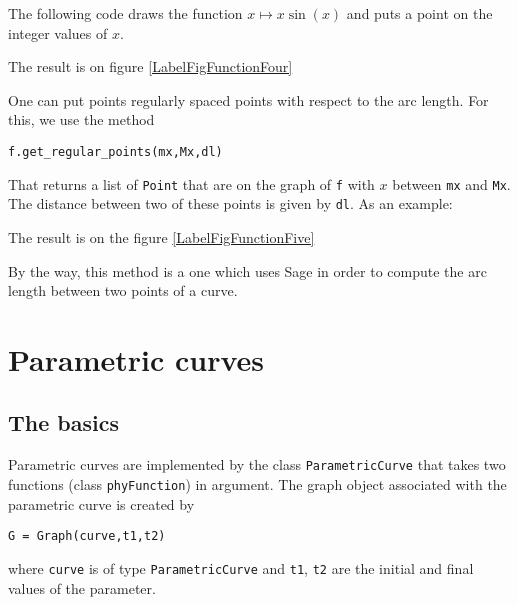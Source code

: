 The following code draws the function $x\mapsto x\sin(x)$ and puts a point on the integer values of $x$.

The result is on figure \ref{LabelFigFunctionFour}
\newcommand{\CaptionFigFunctionFour}{Some points on the graph of a function. These points are regularly espaced with respect to the $x$ value.}


One can put points regularly spaced points with respect to the arc length. For this, we use the method
\begin{verbatim}
f.get_regular_points(mx,Mx,dl)
\end{verbatim}
That returns a list of \verb+Point+ that are on the graph of \verb+f+ with $x$ between \verb+mx+ and \verb+Mx+. The distance between two of these points is given by \verb+dl+. As an example: 

The result is on the figure \ref{LabelFigFunctionFive}
\newcommand{\CaptionFigFunctionFive}{Some points on the graph of a function. These points are regularly espaced with respect to the arc length.}


By the way, this method is a one which uses Sage in order to compute the arc length between two points of a curve.

\section{Parametric curves}

\subsection{The basics}

Parametric curves are implemented by the class \verb+ParametricCurve+ that takes two functions (class \verb+phyFunction+) in argument. The graph object associated with the parametric curve is created by
\begin{verbatim}
G = Graph(curve,t1,t2)
\end{verbatim}
where \verb+curve+ is of type \verb+ParametricCurve+ and \verb+t1+, \verb+t2+ are the initial and final values of the parameter.

